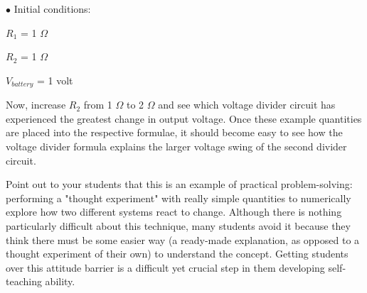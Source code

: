 \medskip
\goodbreak
\item{$\bullet$} Initial conditions:
\item{\hskip 20pt} $R_1$ = 1 $\Omega$ 
\item{\hskip 20pt} $R_2$ = 1 $\Omega$ 
\item{\hskip 20pt} $V_{battery}$ = 1 volt 
\medskip

Now, increase $R_2$ from 1 $\Omega$ to 2 $\Omega$ and see which voltage divider circuit has experienced the greatest change in output voltage.  Once these example quantities are placed into the respective formulae, it should become easy to see how the voltage divider formula explains the larger voltage swing of the second divider circuit.

\vskip 10pt

Point out to your students that this is an example of practical problem-solving: performing a "thought experiment" with really simple quantities to numerically explore how two different systems react to change.  Although there is nothing particularly difficult about this technique, many students avoid it because they think there must be some easier way (a ready-made explanation, as opposed to a thought experiment of their own) to understand the concept.  Getting students over this attitude barrier is a difficult yet crucial step in them developing self-teaching ability.




